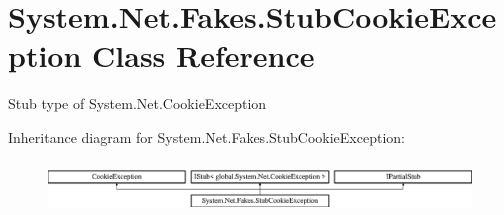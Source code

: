 \hypertarget{class_system_1_1_net_1_1_fakes_1_1_stub_cookie_exception}{\section{System.\-Net.\-Fakes.\-Stub\-Cookie\-Exception Class Reference}
\label{class_system_1_1_net_1_1_fakes_1_1_stub_cookie_exception}
}


Stub type of System.\-Net.\-Cookie\-Exception 


Inheritance diagram for System.\-Net.\-Fakes.\-Stub\-Cookie\-Exception\-:\begin{figure}[H]
\begin{center}
\leavevmode
\includegraphics[height=1.377614cm]{class_system_1_1_net_1_1_fakes_1_1_stub_cookie_exception}
\end{center}
\end{figure}

